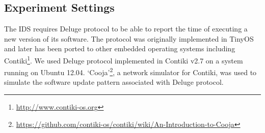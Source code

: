 \documentclass[conference,manuscript]{IEEEtran}
\newcommand{\notedme}[1]{\raisebox{0pt}[0pt][0pt]{\pdfcomment[open=true,color=blue]{#1}}}
\newcommand*{\bd}[1]{\multicolumn{1}{|c}{\bfseries #1}}
\begin{document}




\subsection*{Experiment Settings}
\label{subsec:sim_env}


The IDS requires Deluge protocol to be able to report the time of executing  a new version of its software.
The protocol was originally implemented in TinyOS and later has been ported to other embedded operating systems including Contiki\footnote{\url{http://www.contiki-os.org}}. 
We used Deluge protocol implemented in Contiki v2.7 on a system running on Ubuntu 12.04.
`Cooja'\footnote{\url{https://github.com/contiki-os/contiki/wiki/An-Introduction-to-Cooja}}, a network simulator for Contiki, was used to simulate the software update pattern associated with Deluge protocol.
\end{document}
